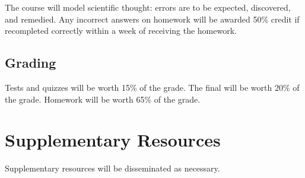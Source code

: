 \documentclass[11pt,article,oneside]{memoir}
\begin{document}
The course will model scientific thought: errors are to be expected, discovered, and remedied. Any incorrect answers
on homework will be awarded 50\% credit if recompleted correctly within a week of receiving the homework.

\subsection*{Grading}
	Tests and quizzes will be worth 15\% of the grade. The final will be worth 20\% of the grade. Homework will be worth 65\% of the grade.


\section*{Supplementary Resources}
Supplementary resources will be disseminated as necessary.
\end{document}
